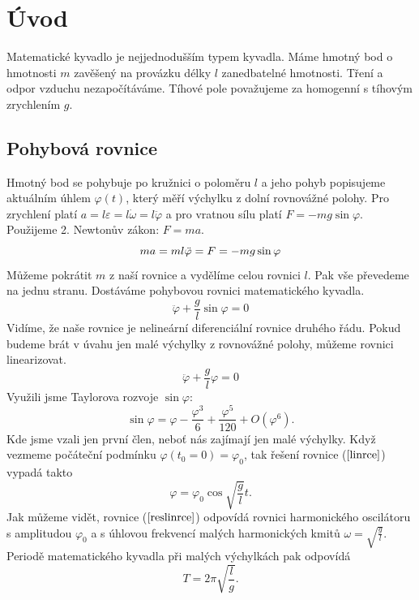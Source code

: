 \section{Úvod}
\label{sec:Úvod}

Matematické kyvadlo je nejjednodušším typem kyvadla. Máme hmotný bod o hmotnosti $m$ zavěšený na provázku délky $l$ zanedbatelné hmotnosti. Tření a odpor vzduchu nezapočítáváme. Tíhové pole považujeme za homogenní s tíhovým zrychlením $g$.

\subsection{Pohybová rovnice}
\label{sec:Pohybová rovnice}
Hmotný bod se pohybuje po kružnici o poloměru $l$ a jeho pohyb popisujeme aktuálním úhlem $\varphi(t)$, který měří výchylku z dolní rovnovážné polohy. Pro zrychlení platí $a=l\varepsilon=l\dot{\omega}=l\ddot{\varphi}$ a pro vratnou sílu platí $F=-mg\sin\varphi$. Použijeme 2. Newtonův zákon: $F=ma$.
\begin{equation*}
ma=ml\ddot{\varphi}=F=-mg\sin\varphi\\
\end{equation*}
Můžeme pokrátit $m$ z naší rovnice a vydělíme celou rovnici $l$. Pak vše převedeme na jednu stranu. Dostáváme pohybovou rovnici matematického kyvadla.
\begin{equation}
\label{pohyb}
\boxed{\ddot{\varphi}+\frac{g}{l}\sin\varphi=0}
\end{equation}
Vidíme, že naše rovnice je nelineární diferenciální rovnice druhého řádu. Pokud budeme brát v úvahu jen malé výchylky z rovnovážné polohy, můžeme rovnici linearizovat.
\begin{equation}
\label{linrce}
\ddot{\varphi}+\frac{g}{l}\varphi=0
\end{equation}
Využili jsme Taylorova rozvoje $\sin\varphi$:
\begin{equation*}
\sin\varphi = \varphi-\frac{\varphi^3}{6}+\frac{\varphi^5}{120}+O\left(\varphi^6\right).
\end{equation*}
Kde jsme vzali jen první člen, neboť nás zajímají jen malé výchylky. Když vezmeme počáteční podmínku $\varphi(t_0=0)=\varphi_0$, tak řešení rovnice ($\ref{linrce}$) vypadá takto
\begin{equation}
\label{reslinrce}
\varphi=\varphi_0\cos\sqrt{\frac{g}{l}}t.
\end{equation}
Jak můžeme vidět, rovnice ($\ref{reslinrce}$) odpovídá rovnici harmonického oscilátoru s amplitudou $\varphi_0$ a s úhlovou frekvencí malých harmonických kmitů $\omega = \sqrt{\frac{g}{l}}$.
Periodě matematického kyvadla při malých výchylkách pak odpovídá
\begin{equation}
\label{malperiod}
T=2\pi\sqrt{\frac{l}{g}}.
\end{equation}

